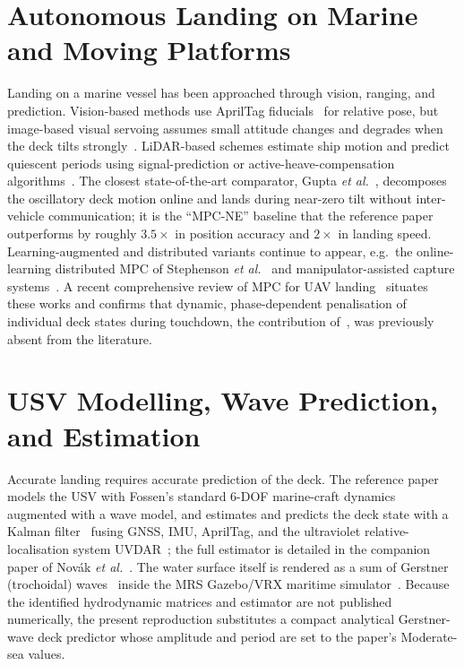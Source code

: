 \documentclass[12pt,a4paper]{report}
\begin{document}
\section{Autonomous Landing on Marine and Moving Platforms}
Landing on a marine vessel has been approached through vision, ranging, and prediction. Vision-based methods use AprilTag fiducials~\cite{olson2011,wang2016} for relative pose, but image-based visual servoing assumes small attitude changes and degrades when the deck tilts strongly~\cite{cho2022}. LiDAR-based schemes estimate ship motion and predict quiescent periods using signal-prediction or active-heave-compensation algorithms~\cite{abujoub2018}. The closest state-of-the-art comparator, Gupta \emph{et al.}~\cite{gupta2023}, decomposes the oscillatory deck motion online and lands during near-zero tilt without inter-vehicle communication; it is the ``MPC-NE'' baseline that the reference paper outperforms by roughly $3.5\times$ in position accuracy and $2\times$ in landing speed. Learning-augmented and distributed variants continue to appear, e.g.\ the online-learning distributed MPC of Stephenson \emph{et al.}~\cite{stephenson2024} and manipulator-assisted capture systems~\cite{xu2024}. A recent comprehensive review of MPC for UAV landing~\cite{panjavarnam2025} situates these works and confirms that dynamic, phase-dependent penalisation of individual deck states during touchdown, the contribution of~\cite{prochazka2024}, was previously absent from the literature.

\section{USV Modelling, Wave Prediction, and Estimation}
Accurate landing requires accurate prediction of the deck. The reference paper models the USV with Fossen's standard 6-DOF marine-craft dynamics~\cite{fossen2011} augmented with a wave model, and estimates and predicts the deck state with a Kalman filter~\cite{kalman1960} fusing GNSS, IMU, AprilTag, and the ultraviolet relative-localisation system UVDAR~\cite{walter2019}; the full estimator is detailed in the companion paper of Nov\'ak \emph{et al.}~\cite{novak2025}. The water surface itself is rendered as a sum of Gerstner (trochoidal) waves~\cite{tessendorf2001} inside the MRS Gazebo/VRX maritime simulator~\cite{bingham2019,baca2021,hert2023}. Because the identified hydrodynamic matrices and estimator are not published numerically, the present reproduction substitutes a compact analytical Gerstner-wave deck predictor whose amplitude and period are set to the paper's Moderate-sea values.
\end{document}
